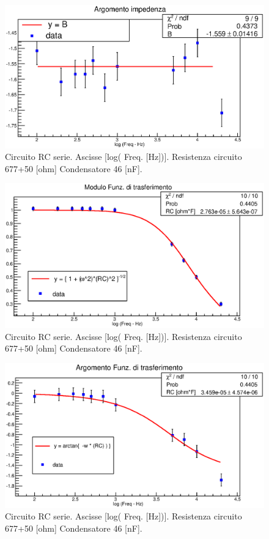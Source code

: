 \begin{figure}[H]
\centering
\includegraphics[scale=0.7]{Grafici/C3_P1_ArgImp_cond2.eps}
\caption{
Circuito RC serie.
Ascisse [log( Freq. [Hz])].
Resistenza circuito 677+50 [ohm]
Condensatore 46 [nF].
}
\label{fig:C3_P1_ArgImp_cond2}
\end{figure}

\begin{figure}[H]
\centering
\includegraphics[scale=0.7]{Grafici/C3_P1_ModFdT_cond2.eps}
\caption{
Circuito RC serie.
Ascisse [log( Freq. [Hz])].
Resistenza circuito 677+50 [ohm]
Condensatore 46 [nF].
}
\label{fig:C3_P1_ModFdT_cond2}
\end{figure}

\begin{figure}[H]
\centering
\includegraphics[scale=0.7]{Grafici/C3_P1_ArgFdT_cond2.eps}
\caption{
Circuito RC serie.
Ascisse [log( Freq. [Hz])].
Resistenza circuito 677+50 [ohm]
Condensatore 46 [nF].
}
\label{fig:C3_P1_ArgFdT_cond2}
\end{figure}



